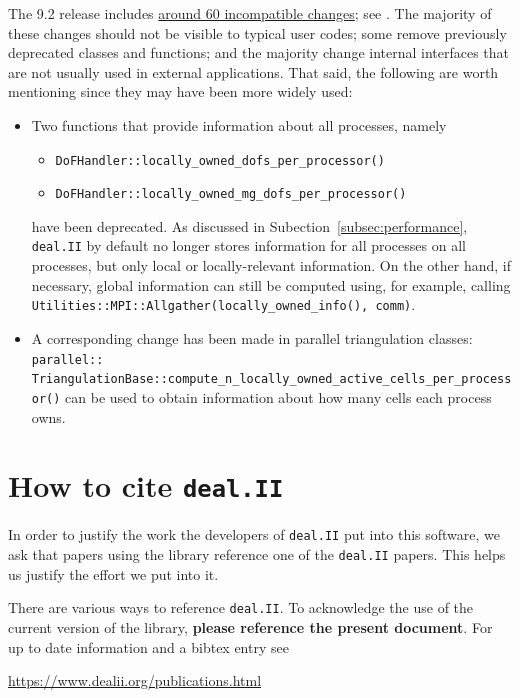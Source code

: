 \documentclass{ansarticle-preprint}
\newcommand{\specialword}[1]{\texttt{#1}}
\newcommand{\dealii}{{\specialword{deal.II}}\xspace}
\begin{document}
The 9.2 release includes
\href{https://dealii.org/developer/doxygen/deal.II/changes_between_9_1_1_and_9_2_0.html}
     {around 60 incompatible changes}; see \cite{changes92}. The majority of these changes
should not be visible to typical user codes; some remove previously
deprecated classes and functions; and the majority change internal
interfaces that are not usually used in external
applications. That said, the following are worth mentioning since they
may have been more widely used:
\begin{itemize}
\item Two functions that provide information about all processes,
  namely
  \begin{itemize}
 \item \texttt{DoFHandler::locally\_owned\_dofs\_per\_processor()}
 \item \texttt{DoFHandler::locally\_owned\_mg\_dofs\_per\_processor()}
  \end{itemize}
have been deprecated. As discussed in
Subection~\ref{subsec:performance}, \dealii{} by default no longer
stores information for all processes on all processes, but only
local or locally-relevant information. On the other
hand, if necessary, global information can still be computed using,
for example, calling
\texttt{Utilities::MPI::Allgather(locally\_owned\_info(), comm)}.

\item A corresponding change has been made in parallel triangulation
  classes:
  \texttt{parallel::} \texttt{TriangulationBase::compute\_n\_locally\_owned\_active\_cells\_per\_processor()}
  can be used to obtain information about how many cells each
  process owns.
\end{itemize}



\section{How to cite \dealii}\label{sec:cite}

In order to justify the work the developers of \dealii{} put into this
software, we ask that papers using the library reference one of the
\dealii{} papers. This helps us justify the effort we put into it.

There are various ways to reference \dealii{}. To acknowledge the use of
the current version of the library, \textbf{please reference the present
document}. For up to date information and a bibtex entry
see
\begin{center}
 \url{https://www.dealii.org/publications.html}
\end{center}
\end{document}
